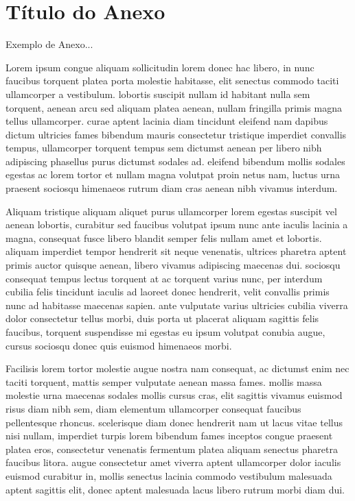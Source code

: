 \chapter{Título do Anexo}

Exemplo de Anexo...

Lorem ipsum congue aliquam sollicitudin lorem donec hac libero, in nunc faucibus torquent platea porta molestie habitasse, elit senectus commodo taciti ullamcorper a vestibulum. lobortis suscipit nullam id habitant nulla sem torquent, aenean arcu sed aliquam platea aenean, nullam fringilla primis magna tellus ullamcorper. curae aptent lacinia diam tincidunt eleifend nam dapibus dictum ultricies fames bibendum mauris consectetur tristique imperdiet convallis tempus, ullamcorper torquent tempus sem dictumst aenean per libero nibh adipiscing phasellus purus dictumst sodales ad. eleifend bibendum mollis sodales egestas ac lorem tortor et nullam magna volutpat proin netus nam, luctus urna praesent sociosqu himenaeos rutrum diam cras aenean nibh vivamus interdum. 

Aliquam tristique aliquam aliquet purus ullamcorper lorem egestas suscipit vel aenean lobortis, curabitur sed faucibus volutpat ipsum nunc ante iaculis lacinia a magna, consequat fusce libero blandit semper felis nullam amet et lobortis. aliquam imperdiet tempor hendrerit sit neque venenatis, ultrices pharetra aptent primis auctor quisque aenean, libero vivamus adipiscing maecenas dui. sociosqu consequat tempus lectus torquent at ac torquent varius nunc, per interdum cubilia felis tincidunt iaculis ad laoreet donec hendrerit, velit convallis primis nunc ad habitasse maecenas sapien. ante vulputate varius ultricies cubilia viverra dolor consectetur tellus morbi, duis porta ut placerat aliquam sagittis felis faucibus, torquent suspendisse mi egestas eu ipsum volutpat conubia augue, cursus sociosqu donec quis euismod himenaeos morbi. 

Facilisis lorem tortor molestie augue nostra nam consequat, ac dictumst enim nec taciti torquent, mattis semper vulputate aenean massa fames. mollis massa molestie urna maecenas sodales mollis cursus cras, elit sagittis vivamus euismod risus diam nibh sem, diam elementum ullamcorper consequat faucibus pellentesque rhoncus. scelerisque diam donec hendrerit nam ut lacus vitae tellus nisi nullam, imperdiet turpis lorem bibendum fames inceptos congue praesent platea eros, consectetur venenatis fermentum platea aliquam senectus pharetra faucibus litora. augue consectetur amet viverra aptent ullamcorper dolor iaculis euismod curabitur in, mollis senectus lacinia commodo vestibulum malesuada aptent sagittis elit, donec aptent malesuada lacus libero rutrum morbi diam dui. 

